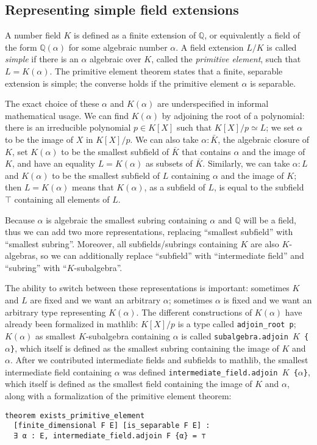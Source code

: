 \documentclass[a4paper,USenglish,cleveref, autoref, thm-restate]{lipics-v2021}
\newcommand{\lean}[1]{\texttt{#1}\xspace} %
\newcommand{\mathlib}{\textsf{mathlib}\xspace}
\newcommand{\Q}{\mathbb{Q}}
\begin{document}
\subsection{Representing simple field extensions}

A number field $K$ is defined as a finite extension of $\Q$, or equivalently a field of the form $\Q(\alpha)$ for some algebraic number $\alpha$.
A field extension $L / K$ is called \emph{simple} if there is an $\alpha$ algebraic over $K$, called the \emph{primitive element}, such that $L = K(\alpha)$.
The primitive element theorem states that a finite, separable extension is simple; the converse holds if the primitive element $\alpha$ is separable.

The exact choice of these $\alpha$ and $K(\alpha)$ are underspecified in informal mathematical usage.
We can find $K(\alpha)$ by adjoining the root of a polynomial: there is an irreducible polynomial $p \in K[X]$ such that $K[X] / p \simeq L$; we set $\alpha$ to be the image of $X$ in $K[X] / p$.
We can also take $\alpha : \bar{K}$, the algebraic closure of $K$, set $K(\alpha)$ to be the smallest subfield of $\bar{K}$ that contains $\alpha$ and the image of $K$, and have an equality $L = K(\alpha)$ as subsets of $\bar{K}$.
Similarly, we can take $\alpha : L$ and $K(\alpha)$ to be the smallest subfield of $L$ containing $\alpha$ and the image of $K$; then $L = K(\alpha)$ means that $K(\alpha)$, as a subfield of $L$, is equal to the subfield $\top$ containing all elements of $L$.

Because $\alpha$ is algebraic the smallest subring containing $\alpha$ and $\Q$ will be a field, thus we can add two more representations, replacing ``smallest subfield'' with ``smallest subring''.
Moreover, all subfields/subrings containing $K$ are also $K$-algebras, so we can additionally replace ``subfield'' with ``intermediate field'' and ``subring'' with ``$K$-subalgebra''.

The ability to switch between these representations is important: sometimes $K$ and $L$ are fixed and we want an arbitrary $\alpha$; sometimes $\alpha$ is fixed and we want an arbitrary type representing $K(\alpha)$.
The different constructions of $K(\alpha)$ have already been formalized in \mathlib:
$K[X] / p$ is a type called \lean{adjoin\_root p};
$K(\alpha)$ as smallest $K$-subalgebra containing $\alpha$ is called \lean{subalgebra.adjoin $K$ \{$\alpha$\}},
which itself is defined as the smallest subring containing the image of $K$ and $\alpha$.
After we contributed intermediate fields and subfields to \mathlib,
the smallest intermediate field containing $\alpha$ was defined \lean{intermediate\_field.adjoin $K$ \{$\alpha$\}},
which itself is defined as the smallest field containing the image of $K$ and $\alpha$,
along with a formalization of the primitive element theorem:
\begin{lstlisting}
theorem exists_primitive_element
  [finite_dimensional F E] [is_separable F E] :
  ∃ α : E, intermediate_field.adjoin F {α} = ⊤
\end{lstlisting}
\end{document}
